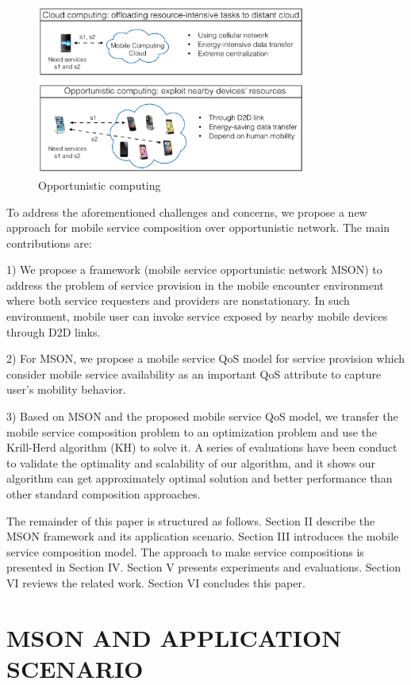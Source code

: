 \documentclass[10pt,journal,compsoc]{IEEEtran}
\begin{document}
\begin{figure}[!t]
\centering
\includegraphics[width=3.5in]{./img/pic1.png}
\caption{Opportunistic computing}
\label{fig_opportunistic}
\end{figure}

To address the aforementioned challenges and concerns, we propose a new approach for mobile service composition over opportunistic network. The main contributions are:

1) We propose a framework (mobile service opportunistic network MSON) to address the problem of service provision in the mobile encounter environment where both service requesters and providers are nonstationary. In such environment, mobile user can invoke service exposed by nearby mobile devices through D2D links.

2) For MSON, we propose a mobile service QoS model for service provision which consider mobile service availability as an important QoS attribute to capture user's mobility behavior.

3) Based on MSON and the proposed mobile service QoS model, we transfer the mobile service composition problem to an optimization problem and use the Krill-Herd algorithm (KH) to solve it. A series of evaluations have been conduct to validate the optimality and scalability of our algorithm, and it shows our algorithm can get approximately optimal solution and better performance than other standard composition approaches. 

The remainder of this paper is structured as follows. Section II describe the MSON framework and its application scenario. Section III introduces the mobile service composition model. The approach to make service compositions is presented in Section IV. Section V presents experiments and evaluations. Section VI reviews the related work. Section VI concludes this paper.

\section{MSON AND APPLICATION SCENARIO}
\end{document}
